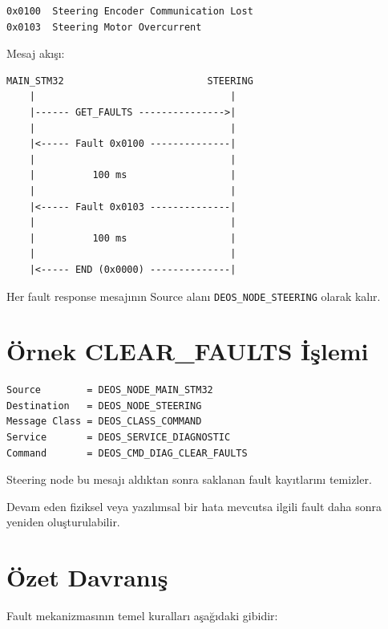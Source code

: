 \documentclass[a4paper,11pt]{article}
\begin{document}
\begin{lstlisting}
0x0100  Steering Encoder Communication Lost
0x0103  Steering Motor Overcurrent
\end{lstlisting}

Mesaj akışı:

\begin{lstlisting}
MAIN_STM32                         STEERING
    |                                  |
    |------ GET_FAULTS --------------->|
    |                                  |
    |<----- Fault 0x0100 --------------|
    |                                  |
    |          100 ms                  |
    |                                  |
    |<----- Fault 0x0103 --------------|
    |                                  |
    |          100 ms                  |
    |                                  |
    |<----- END (0x0000) --------------|
\end{lstlisting}

Her fault response mesajının Source alanı
\texttt{DEOS\_NODE\_STEERING} olarak kalır.

\section{Örnek CLEAR\_FAULTS İşlemi}

\begin{lstlisting}
Source        = DEOS_NODE_MAIN_STM32
Destination   = DEOS_NODE_STEERING
Message Class = DEOS_CLASS_COMMAND
Service       = DEOS_SERVICE_DIAGNOSTIC
Command       = DEOS_CMD_DIAG_CLEAR_FAULTS
\end{lstlisting}

Steering node bu mesajı aldıktan sonra saklanan fault kayıtlarını
temizler.

Devam eden fiziksel veya yazılımsal bir hata mevcutsa ilgili
fault daha sonra yeniden oluşturulabilir.

\section{Özet Davranış}

Fault mekanizmasının temel kuralları aşağıdaki gibidir:
\end{document}
